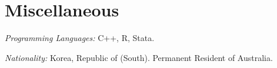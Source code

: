 \documentclass[10pt,letterpaper]{article}
\renewenvironment{itemize}{
  \begin{list}{}{
      \setlength{\leftmargin}{1.5em}
      \setlength{\itemsep}{0.25em}
      \setlength{\parskip}{0pt}
      \setlength{\parsep}{0.25em}
    }
}{
  \end{list}
}
\begin{document}

\section*{Miscellaneous}

\begin{itemize}
\item \textit{Programming Languages:} C++, R, Stata.
\item \textit{Nationality:} Korea, Republic of (South). Permanent Resident of Australia.
\end{itemize}

\vfill
\end{document}
